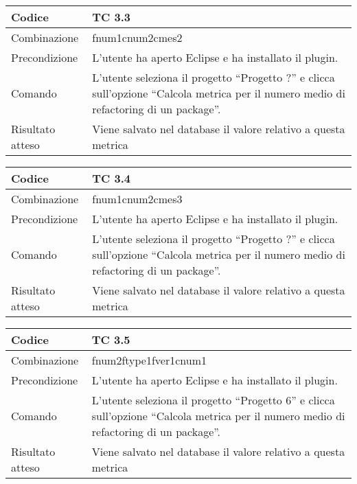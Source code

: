 \begin{table}[ht]
\begin{tabular}{|p{3cm}|p{9cm}|}
\hline
\cellcolor{lightgray}Codice				& TC 3.3								\\
\hline
\cellcolor{lightgray}Combinazione		& fnum1cnum2cmes2									\\
\hline
\cellcolor{lightgray}Precondizione		& L'utente ha aperto Eclipse e ha installato il plugin.					\\
\hline
\cellcolor{lightgray}Comando			& L'utente seleziona il progetto ``Progetto ?''  e clicca sull'opzione ``Calcola metrica per il numero medio di refactoring di un package''.	\\
\hline
\cellcolor{lightgray}Risultato atteso	& Viene salvato nel database il valore relativo a questa metrica	\\
\hline
\end{tabular}
\end{table}

\begin{table}[ht]
\begin{tabular}{|p{3cm}|p{9cm}|}
\hline
\cellcolor{lightgray}Codice				& TC 3.4								\\
\hline
\cellcolor{lightgray}Combinazione		& fnum1cnum2cmes3									\\
\hline
\cellcolor{lightgray}Precondizione		& L'utente ha aperto Eclipse e ha installato il plugin.			\\
\hline
\cellcolor{lightgray}Comando			& L'utente seleziona il progetto ``Progetto ?''  e clicca sull'opzione ``Calcola metrica per il numero medio di refactoring di un package''.	\\
\hline
\cellcolor{lightgray}Risultato atteso	& Viene salvato nel database il valore relativo a questa metrica	\\
\hline
\end{tabular}
\end{table}

\begin{table}[ht]
\begin{tabular}{|p{3cm}|p{9cm}|}
\hline
\cellcolor{lightgray}Codice				& TC 3.5								\\
\hline
\cellcolor{lightgray}Combinazione		& fnum2ftype1fver1cnum1 									\\
\hline
\cellcolor{lightgray}Precondizione		& L'utente ha aperto Eclipse e ha installato il plugin.			\\
\hline
\cellcolor{lightgray}Comando			& L'utente seleziona il progetto ``Progetto 6''  e clicca sull'opzione ``Calcola metrica per il numero medio di refactoring di un package''.	\\
\hline
\cellcolor{lightgray}Risultato atteso	& Viene salvato nel database il valore relativo a questa metrica	\\
\hline
\end{tabular}
\end{table}

